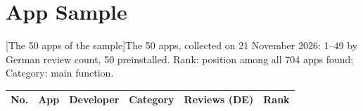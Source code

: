 \chapter{App Sample}
\label{app:sample}

\begin{singlespace}
\scriptsize
\setlength{\tabcolsep}{4pt}
\renewcommand{\arraystretch}{0.9}
\noindent\begin{minipage}{\textwidth}
[The 50 apps of the sample]{The 50 apps, collected on
21 November 2026: 1--49 by German review count, 50 preinstalled. Rank:
position among all 704 apps found; Category: main function.}
\label{tab:sample}
\begin{tabularx}{\textwidth}{@{}r>{\raggedright\arraybackslash}X>{\raggedright\arraybackslash}p{3.6cm}lrr@{}}
\toprule
\textbf{No.} & \textbf{App} & \textbf{Developer} & \textbf{Category} & \textbf{Reviews (DE)} & \textbf{Rank} \\
\midrule
\end{tabularx}
\end{minipage}
\end{singlespace}
